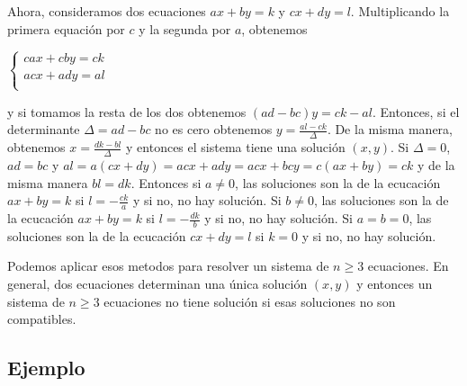 Ahora, consideramos dos ecuaciones $ax+by=k$ y $cx+dy=l$. Multiplicando
la primera equación por $c$ y la segunda por $a$, obtenemos

$\left\{
\begin{aligned}
  ca x + cb y = ck \\
  ac x + ad y = al \\
\end{aligned}\right.$

y si tomamos la resta de los dos obtenemos
${(ad - bc)} y = ck - al$. Entonces, si el determinante
$\Delta = ad - bc$ no es cero obtenemos $y = \frac{al - ck}{\Delta}$. De la
misma manera, obtenemos $x = \frac{dk - bl}{\Delta}$ y entonces el sistema
tiene una solución $(x, y)$. Si $\Delta = 0$, $ad = bc$ y 
$al = a{(cx+dy)} = acx + ady = acx+bcy = c{(ax+by)} = ck$ y de la misma manera
$bl = dk$. Entonces si $a \neq 0$, las soluciones son la de la ecucación 
$ax + by = k$ si $l = -\frac{ck}{a}$ y si no, no hay solución. Si $b \neq 0$,
las soluciones son la de la ecucación $ax + by = k$ si $l = -\frac{dk}{b}$
y si no, no hay solución. Si $a = b = 0$, las soluciones son la de la ecucación
$cx + dy = l$ si $k = 0$ y si no, no hay solución.

Podemos aplicar esos metodos para resolver un sistema de $n \geq 3$ ecuaciones.
En general, dos ecuaciones determinan una única solución $(x,y)$ y entonces
un sistema de $n \geq 3$ ecuaciones no tiene solución si esas soluciones no
son compatibles.

\subsection*{Ejemplo}

